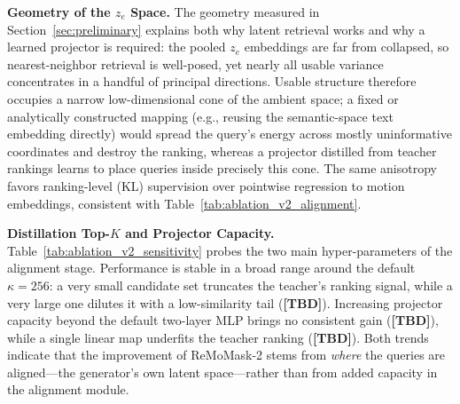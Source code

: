 \documentclass[10pt,journal,compsoc]{IEEEtran}
\newcommand{\myparagraph}[1]{\textbf{#1}\hspace{1.8ex}}
\begin{document}
\noindent \myparagraph{Geometry of the $z_e$ Space.}
The geometry measured in Section~\ref{sec:preliminary} explains both why latent retrieval works and why a learned projector is required: the pooled $z_e$ embeddings are far from collapsed, so nearest-neighbor retrieval is well-posed, yet nearly all usable variance concentrates in a handful of principal directions. Usable structure therefore occupies a narrow low-dimensional cone of the ambient space; a fixed or analytically constructed mapping (e.g., reusing the semantic-space text embedding directly) would spread the query's energy across mostly uninformative coordinates and destroy the ranking, whereas a projector distilled from teacher rankings learns to place queries inside precisely this cone. The same anisotropy favors ranking-level (KL) supervision over pointwise regression to motion embeddings, consistent with Table~\ref{tab:ablation_v2_alignment}.

\noindent \myparagraph{Distillation Top-$K$ and Projector Capacity.}
Table~\ref{tab:ablation_v2_sensitivity} probes the two main hyper-parameters of the alignment stage. Performance is stable in a broad range around the default $\kappa{=}256$: a very small candidate set truncates the teacher's ranking signal, while a very large one dilutes it with a low-similarity tail (\textbf{[TBD]}). Increasing projector capacity beyond the default two-layer MLP brings no consistent gain (\textbf{[TBD]}), while a single linear map underfits the teacher ranking (\textbf{[TBD]}). Both trends indicate that the improvement of ReMoMask-2 stems from \emph{where} the queries are aligned---the generator's own latent space---rather than from added capacity in the alignment module.
\end{document}
